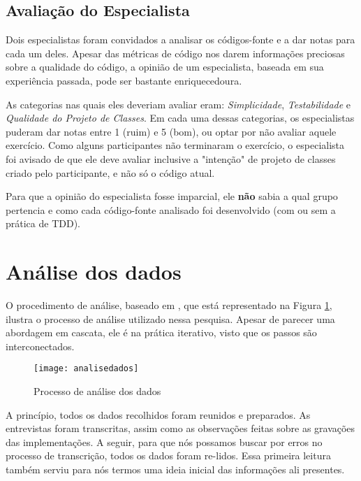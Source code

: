 \subsection{Avaliação do Especialista}
\label{sec:planejamento-especialista}

Dois especialistas foram convidados a analisar os códigos-fonte e a dar notas para cada
um deles. Apesar das métricas de código nos darem informações
preciosas sobre a qualidade do código, a opinião de um especialista, baseada
em sua experiência passada, pode ser bastante enriquecedoura.

As categorias nas quais eles deveriam avaliar eram: \textit{Simplicidade}, \textit{Testabilidade} e
\textit{Qualidade do Projeto de Classes}.
Em cada uma dessas categorias, os especialistas puderam dar notas entre
1 (ruim) e 5 (bom), ou optar por não avaliar aquele exercício.
Como alguns participantes não terminaram o exercício, o especialista
foi avisado de que ele deve avaliar inclusive a "intenção" de projeto de classes criado
pelo participante, e não só o código atual. 

Para que a opinião do especialista fosse imparcial, ele \textbf{não} sabia a qual grupo
pertencia e como cada código-fonte analisado foi desenvolvido (com ou sem a prática de TDD).

\section{Análise dos dados}
\label{sec:planejamento-analise}

O procedimento de análise, baseado em \cite{creswell}, que está representado na
Figura \ref{fig:analise-dados}, ilustra o processo de análise utilizado
nessa pesquisa. Apesar de parecer uma abordagem em cascata, ele é na prática 
iterativo, visto que os passos são interconectados. 

\begin{figure}[h]
  \centering
  \texttt{[image: analisedados]}
  \caption{Processo de análise dos dados}
  \label{fig:analise-dados}
\end{figure}


A princípio, todos os dados recolhidos foram reunidos e preparados. As entrevistas
foram transcritas, assim como as observações feitas sobre as gravações das implementações.
A seguir, para que nós possamos buscar por erros no processo de transcrição, todos
os dados foram re-lidos. Essa primeira leitura também serviu para nós termos
uma ideia inicial das informações ali presentes.

